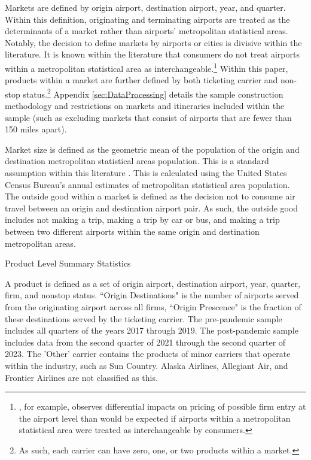 \documentclass{article}
\begin{document}
	Markets are defined by origin airport, destination airport, year, and quarter. Within this definition, originating and terminating airports are treated as the determinants of a market rather than airports' metropolitan statistical areas. Notably, the decision to define markets by airports or cities is divisive within the literature. It is known within the literature that consumers do not treat airports within a metropolitan statistical area as interchangeable.\footnote{\citet{goolsbee_how_2008}, for example, observes differential impacts on pricing of possible firm entry at the airport level than would be expected if airports within a metropolitan statistical area were treated as interchangeable by consumers.} Within this paper, products within a market are further defined by both ticketing carrier and non-stop status.\footnote{As such, each carrier can have zero, one, or two products within a market.} Appendix \ref{sec:DataProcessing} details the sample construction methodology and restrictions on markets and itineraries included within the sample (such as excluding markets that consist of airports that are fewer than 150 miles apart).
	
	Market size is defined as the geometric mean of the population of the origin and destination metropolitan statistical areas population. This is a standard assumption within this literature \citep{ciliberto_market_2021}. This is calculated using the United States Census Bureau's annual estimates of metropolitan statistical area population. The outside good within a market is defined as the decision not to consume air travel between an origin and destination airport pair. As such, the outside good includes not making a trip, making a trip by car or bus, and making a trip between two different airports within the same origin and destination metropolitan areas. 
    
    \begin{table}
    \caption{Product Level Summary Statistics}
    \label{tab:Summary_Statistics_Product}
                    \vspace{-15mm}
                    \begin{center}
    
                        \end{center}
                    \vspace{-5mm}
    \footnotesize{A product is defined as a set of origin airport, destination airport, year, quarter, firm, and nonstop status. ``Origin Destinations" is the number of airports served from the originating airport across all firms, ``Origin Prescence" is the fraction of these destinations served by the ticketing carrier. The pre-pandemic sample includes all quarters of the years 2017 through 2019. The post-pandemic sample includes data from the second quarter of 2021 through the second quarter of 2023. The 'Other' carrier contains the products of minor carriers that operate within the industry, such as Sun Country. Alaska Airlines, Allegiant Air, and Frontier Airlines are not classified as this.}
    \end{table}
\end{document}
